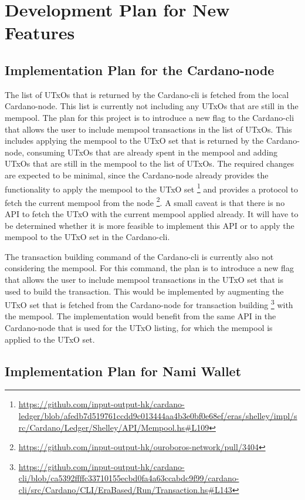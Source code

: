\documentclass[11pt]{article}
\begin{document}
\section{Development Plan for New Features}

\subsection{Implementation Plan for the Cardano-node}

The list of UTxOs that is returned by the Cardano-cli is fetched from the local Cardano-node.
This list is currently not including any UTxOs that are still in the mempool.
The plan for this project is to introduce a new flag to the Cardano-cli that allows the user to include mempool transactions in the list of UTxOs.
This includes applying the mempool to the UTxO set that is returned by the Cardano-node, consuming UTxOs that are already spent in the mempool and
adding UTxOs that are still in the mempool to the list of UTxOs.
The required changes are expected to be minimal, since the Cardano-node already provides the functionality to apply the mempool to the UTxO set \footnote{\url{https://github.com/input-output-hk/cardano-ledger/blob/afedb7d519761ccdd9c013444aa4b3e0bf0e68ef/eras/shelley/impl/src/Cardano/Ledger/Shelley/API/Mempool.hs\#L109}}
and provides a protocol to fetch the current mempool from the node \footnote{\url{https://github.com/input-output-hk/ouroboros-network/pull/3404}}.
A small caveat is that there is no API to fetch the UTxO with the current mempool applied already.
It will have to be determined whether it is more feasible to implement this API or to apply the mempool to the UTxO set in the Cardano-cli.

The transaction building command of the Cardano-cli is currently also not considering the mempool.
For this command, the plan is to introduce a new flag that allows the user to include mempool transactions in the UTxO set that is used to build the transaction.
This would be implemented by augmenting the UTxO set that is fetched from the Cardano-node for transaction building \footnote{\url{https://github.com/input-output-hk/cardano-cli/blob/ca5392ffffc33710155ecbd0fa4a63ccabdc9f99/cardano-cli/src/Cardano/CLI/EraBased/Run/Transaction.hs\#L143}} with the mempool.
The implementation would benefit from the same API in the Cardano-node that is used for the UTxO listing, for which the mempool is applied to the UTxO set.

\subsection{Implementation Plan for Nami Wallet}
\end{document}

